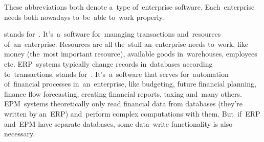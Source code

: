 These abbreviations both denote a~type of~enterprise software.
Each~enterprise needs both nowadays to~be~able to~work properly.
\begin{itemize}
     stands for~.
            It's~a~software for~managing transactions and~resources of~an~enterprise.
            Resources are all the~stuff an~enterprise needs to~work, like money (the~most important resource), available goods in~warehouses, employees etc.
            ERP~systems typically change records in~databases according to~transactions.
     stands for~.
            It's~a~software that serves for~automation of~financial processes in~an~enterprise, like budgeting, future financial planning, finance flow forecasting, creating financial reports, taxing and~many others.
            EPM~systems theoretically only read financial data from databases (they're written by an~ERP) and~perform complex computations with them.
            But~if~ERP and~EPM have separate databases, some data--write functionality is also necessary.
\end{itemize}

